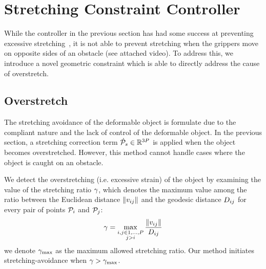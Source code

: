 \section{Stretching Constraint Controller}
\label{sec:stretching_constraint_controller}



While the controller in the previous section has had some success at preventing excessive stretching~\cite{Berenson2013}, it is not able to prevent stretching when the grippers move on opposite sides of an obstacle (see attached video). To address this, we introduce a novel geometric constraint which is able to directly address the cause of overstretch.

\subsection{Overstretch}
\label{Method_Overstretch}
The stretching avoidance of the deformable object is formulate due to the compliant nature and the lack of control of the deformable object. In the previous section, a stretching correction term $\dot{\mathcal{P}}_s \in \mathbb{R}^{3P}$ is applied when the object becomes overstretched. However, this method cannot handle cases where the object is caught on an obstacle.

We detect the overstretching (i.e. excessive strain) of the object by examining the value of the stretching ratio $\gamma$, which denotes the maximum value among the ratio between the Euclidean distance $\| v_{i j} \|$ and the geodesic distance $D_{i j}$ for every pair of points $\mathcal{P}_i$ and $\mathcal{P}_j$:
\begin{equation}
    \gamma = \max_{\substack{i, j \in 1, \dots, P \\ j > i}} \frac{\| v_{i j} \|}{D_{i j}}
    \label{Eq:Method_stretching_detection}
\end{equation}
we denote $\gamma_{\textrm{max}}$ as the maximum allowed stretching ratio. Our method initiates stretching-avoidance when $\gamma > \gamma_{\textrm{max}}$.

